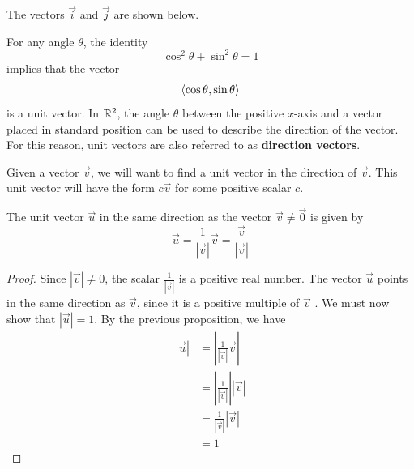 \documentclass[handout]{ximera}
\begin{document}
The vectors $\vec{i}$ and $\vec{j}$ are shown below.

\begin{image}
\end{image}

For any angle $\theta$, the identity 
\[
\cos^2 \theta + \sin^2 \theta = 1
\]
 implies that the vector 
 \[
 \left\langle \cos \theta, \sin \theta\right\rangle
 \]
is a unit vector. In $\mathbb R^2$, the angle $\theta$ between the positive $x$-axis and a vector placed in standard position can be used to describe the direction of the vector.  
For this reason, unit vectors are also referred to as {\bf direction vectors}.

\begin{image}
\end{image}

Given a vector $\vec{v}$, we will want to find a unit vector in the direction of $\vec{v}$.
This unit vector will have the form $c\vec{v}$ for some positive scalar $c$.  
\begin{proposition}
The unit vector $\vec{u}$ in the same direction as the vector $\vec{v} \neq \vec{0}$ is given by 
\[
\vec{u} = \frac{1}{|\vec{v}|} \vec{v} =  \frac{\vec{v}}{|\vec{v}|} 
\]
\begin{proof}
Since $|\vec{v}| \neq 0$, the scalar $\displaystyle \frac{1}{|\vec{v}|}$ is a positive real number.  The vector $\vec{u}$ points 
in the same direction as $\vec{v}$, since it is a positive multiple of $\vec{v}$ . We must now show that $|\vec{u}| = 1$.  
By the previous proposition, we have
\begin{align*}
|\vec{u}| &= \left| \frac{1}{|\vec{v}|} \vec{v} \right|\\
           &= \left| \frac{1}{|\vec{v}|} \right| |\vec{v}|\\
           &= \frac{1}{|\vec{v}|} |\vec{v}|\\
           &= 1
\end{align*}
\end{proof}
\end{proposition}
\end{document}

